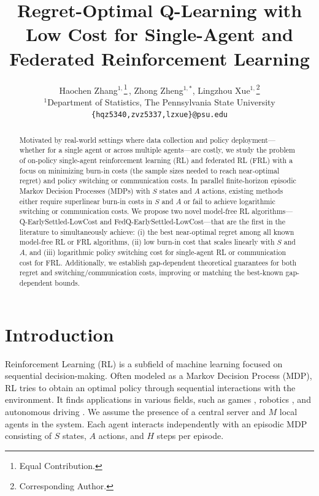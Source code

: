 \documentclass{article}
\title{Regret-Optimal Q-Learning with Low Cost for Single-Agent and Federated Reinforcement Learning}
\author{
  Haochen Zhang$^{1,}$\thanks{Equal Contribution.}\;\,, Zhong Zheng$^{1,*}$, Lingzhou Xue$^{1,}$\thanks{Corresponding Author.}\\
  $^{1}$Department of Statistics, The Pennsylvania State University\\
  \texttt{\{hqz5340,zvz5337,lzxue\}@psu.edu} 
}
\begin{document}
\maketitle
\begin{abstract}
Motivated by real-world settings where data collection and policy deployment---whether for a single agent or across multiple agents---are costly, we study the problem of on-policy single-agent reinforcement learning (RL) and federated RL (FRL) with a focus on minimizing burn-in costs (the sample sizes needed to reach near-optimal regret) and policy switching or communication costs. In parallel finite-horizon episodic Markov Decision Processes (MDPs) with $S$ states and $A$ actions, existing methods either require superlinear burn-in costs in $S$ and $A$ or fail to achieve logarithmic switching or communication costs. We propose two novel model-free RL algorithms---Q-EarlySettled-LowCost and FedQ-EarlySettled-LowCost---that are the first in the literature to simultaneously achieve: (i) the best near-optimal regret among all known model-free RL or FRL algorithms, (ii) low burn-in cost that scales linearly with $S$ and $A$, and (iii) logarithmic policy switching cost for single-agent RL or communication cost for FRL. Additionally, we establish gap-dependent theoretical guarantees for both regret and switching/communication costs, improving or matching the best-known gap-dependent bounds.
\end{abstract}

\section{Introduction}
Reinforcement Learning (RL) \citep{1998Reinforcement} is a subfield of machine learning focused on sequential decision-making. Often modeled as a Markov Decision Process (MDP), RL tries to obtain an optimal policy through sequential interactions with the environment. It finds applications in various fields, such as games \citep{silver2016mastering,silver2017mastering,silver2018general,vinyals2019grandmaster}, robotics \citep{gu2017deep, kober2013reinforcement}, and autonomous driving \citep{yurtsever2020survey}. We assume the presence of a central server and $M$ local agents in the system. Each agent interacts independently with an episodic MDP consisting of $S$ states, $A$ actions, and $H$ steps per episode.
\end{document}
